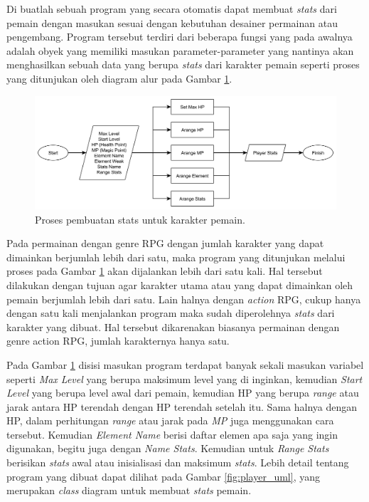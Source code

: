 Di buatlah sebuah program yang secara otomatis dapat membuat \textit{stats} dari pemain dengan masukan sesuai dengan kebutuhan desainer permainan atau pengembang. Program tersebut terdiri dari beberapa fungsi yang pada awalnya adalah obyek yang memiliki masukan parameter-parameter yang nantinya akan menghasilkan sebuah data yang berupa \textit{stats} dari karakter pemain seperti proses yang ditunjukan oleh diagram alur pada Gambar \ref{fig:player_stats_generator}.
\vspace{1ex}

\begin{figure} [!h] \centering
	\includegraphics[scale=0.038]{img/player_stats_generator.png}
	\caption{Proses pembuatan stats untuk karakter pemain.}
	\label{fig:player_stats_generator}
\end{figure}

Pada permainan dengan genre RPG dengan jumlah karakter yang dapat dimainkan berjumlah lebih dari satu, maka program yang ditunjukan melalui proses pada Gambar \ref{fig:player_stats_generator} akan dijalankan lebih dari satu kali. Hal tersebut dilakukan dengan tujuan agar karakter utama atau yang dapat dimainkan oleh pemain berjumlah lebih dari satu. Lain halnya dengan \textit{action} RPG, cukup hanya dengan satu kali menjalankan program maka sudah diperolehnya \textit{stats} dari karakter yang dibuat. Hal tersebut dikarenakan biasanya permainan dengan genre action RPG, jumlah karakternya hanya satu.
\vspace{1ex}

Pada Gambar \ref{fig:player_stats_generator} disisi masukan program terdapat banyak sekali masukan variabel seperti \textit{Max Level} yang berupa maksimum level yang di inginkan, kemudian \textit{Start Level} yang berupa level awal dari pemain, kemudian HP yang berupa \textit{range} atau jarak antara HP terendah dengan HP terendah setelah itu. Sama halnya dengan HP, dalam perhitungan \textit{range} atau jarak pada \textit{MP} juga menggunakan cara tersebut. Kemudian \textit{Element Name} berisi daftar elemen apa saja yang ingin digunakan, begitu juga dengan \textit{Name Stats}. Kemudian untuk \textit{Range Stats} berisikan \textit{stats} awal atau inisialisasi dan maksimum \textit{stats}. Lebih detail tentang program yang dibuat dapat dilihat pada Gambar \ref{fig:player_uml}, yang merupakan \textit{class} diagram untuk membuat \textit{stats} pemain.
\vspace{1ex}

